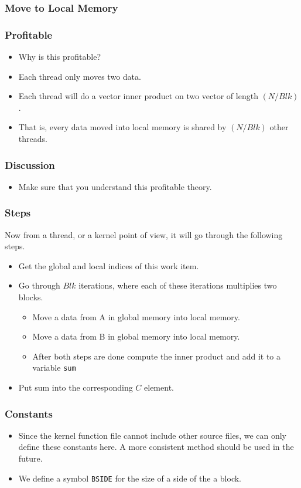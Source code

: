 \documentclass{beamer}
\begin{document}
\begin{frame}
  \frametitle{Move to Local Memory}
  \centerline{}
\end{frame}

\begin{frame}
  \frametitle{Profitable}
  \begin{itemize}
    \item Why is this profitable?
    \item Each thread only moves two data.
    \item Each thread will do a vector inner product on two vector of
      length $(N / Blk)$.
    \item That is, every data moved into local memory is shared by
      $(N / Blk)$ other threads.
  \end{itemize}
\end{frame}

\begin{frame}
  \frametitle{Discussion}
  \begin{itemize}
    \item Make sure that you understand this profitable theory.
  \end{itemize}
\end{frame}

\begin{frame}
  \frametitle{Steps} Now from a thread, or a kernel point of view, it
  will go through the following steps.
  \begin{itemize}
    \item Get the global and local indices of this work item.
    \item Go through $Blk$ iterations, where each of these
      iterations multiplies two blocks.
      \begin{itemize}
        \item Move a data from A in global memory into local memory.
        \item Move a data from B in global memory into local memory.
        \item After both steps are done compute the inner product and
          add it to a variable {\tt sum}
      \end{itemize}
    \item Put sum into the corresponding $C$ element.
  \end{itemize}
\end{frame}

\begin{frame}
  \frametitle{Constants}
  \begin{itemize}
    \item Since the kernel function file cannot include other source
      files, we can only define these constants here. A more
      consistent method should be used in the future.
    \item We define a symbol {\tt BSIDE} for the size of a side of the
      a block.
  \end{itemize}
\end{frame}
\end{document}
